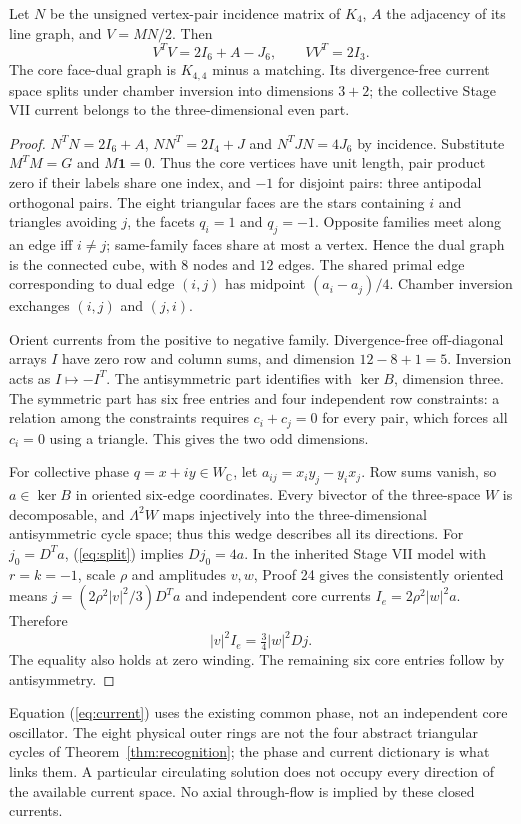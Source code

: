 \begin{theorem}\label{thm:core}
Let $N$ be the unsigned vertex-pair incidence matrix of $K_4$, $A$ the adjacency of its line graph, and $V=MN/2$. Then
\begin{equation}
 V^TV=2I_6+A-J_6,\qquad VV^T=2I_3.
\end{equation}
The core face-dual graph is $K_{4,4}$ minus a matching. Its divergence-free current space splits under chamber inversion into dimensions $3+2$; the collective Stage VII current belongs to the three-dimensional even part.
\end{theorem}
\begin{proof}
$N^TN=2I_6+A$, $NN^T=2I_4+J$ and $N^TJN=4J_6$ by incidence. Substitute $M^TM=G$ and $M\mathbf1=0$. Thus the core vertices have unit length, pair product zero if their labels share one index, and $-1$ for disjoint pairs: three antipodal orthogonal pairs. The eight triangular faces are the stars containing $i$ and triangles avoiding $j$, the facets $q_i=1$ and $q_j=-1$. Opposite families meet along an edge iff $i\ne j$; same-family faces share at most a vertex. Hence the dual graph is the connected cube, with $8$ nodes and $12$ edges. The shared primal edge corresponding to dual edge $(i,j)$ has midpoint $(a_i-a_j)/4$. Chamber inversion exchanges $(i,j)$ and $(j,i)$.

Orient currents from the positive to negative family. Divergence-free off-diagonal arrays $I$ have zero row and column sums, and dimension $12-8+1=5$. Inversion acts as $I\mapsto-I^T$. The antisymmetric part identifies with $\ker B$, dimension three. The symmetric part has six free entries and four independent row constraints: a relation among the constraints requires $c_i+c_j=0$ for every pair, which forces all $c_i=0$ using a triangle. This gives the two odd dimensions.

For collective phase $q=x+iy\in W_{\mathbb C}$, let $a_{ij}=x_i y_j-y_i x_j$. Row sums vanish, so $a\in\ker B$ in oriented six-edge coordinates. Every bivector of the three-space $W$ is decomposable, and $\Lambda^2W$ maps injectively into the three-dimensional antisymmetric cycle space; thus this wedge describes all its directions. For $j_0=D^Ta$, (\ref{eq:split}) implies $Dj_0=4a$. In the inherited Stage VII model with $r=k=-1$, scale $\rho$ and amplitudes $v,w$, Proof 24 gives the consistently oriented means $j=(2\rho^2|v|^2/3)D^Ta$ and independent core currents $I_e=2\rho^2|w|^2a$. Therefore
\begin{equation}
 |v|^2 I_e=\tfrac34|w|^2 Dj.\label{eq:current}
\end{equation}
The equality also holds at zero winding. The remaining six core entries follow by antisymmetry.
\end{proof}
Equation (\ref{eq:current}) uses the existing common phase, not an independent core oscillator. The eight physical outer rings are not the four abstract triangular cycles of Theorem~\ref{thm:recognition}; the phase and current dictionary is what links them. A particular circulating solution does not occupy every direction of the available current space. No axial through-flow is implied by these closed currents.

